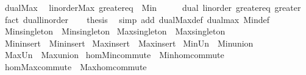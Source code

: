 \begin{isabellebody}
\isamarkupfalse%
%
\endisatagproof
{\isafoldproof}%
%
\isadelimproof
\isanewline
%
\endisadelimproof
\isanewline
{}\isamarkupfalse%
\ dual{\isacharunderscore}{\kern0pt}Max{\isacharcolon}{\kern0pt}\isanewline
\ \ {\isachardoublequoteopen}linorder{\isachardot}{\kern0pt}Max\ greater{\isacharunderscore}{\kern0pt}eq\ {\isacharequal}{\kern0pt}\ Min{\isachardoublequoteclose}\isanewline
%
\isadelimproof
%
\endisadelimproof
%
\isatagproof
{}\isamarkupfalse%
\ {\isacharminus}{\kern0pt}\isanewline
\ \ \isamarkupfalse%
\ dual{\isacharcolon}{\kern0pt}\ linorder\ greater{\isacharunderscore}{\kern0pt}eq\ greater\ \isamarkupfalse%
\ {\isacharparenleft}{\kern0pt}fact\ dual{\isacharunderscore}{\kern0pt}linorder{\isacharparenright}{\kern0pt}\isanewline
\ \ \isamarkupfalse%
\ {\isacharquery}{\kern0pt}thesis\ \isamarkupfalse%
\ {\isacharparenleft}{\kern0pt}simp\ add{\isacharcolon}{\kern0pt}\ dual{\isachardot}{\kern0pt}Max{\isacharunderscore}{\kern0pt}def\ dual{\isacharunderscore}{\kern0pt}max\ Min{\isacharunderscore}{\kern0pt}def{\isacharparenright}{\kern0pt}\isanewline
{}\isamarkupfalse%
%
\endisatagproof
{\isafoldproof}%
%
\isadelimproof
\isanewline
%
\endisadelimproof
\isanewline
{}\isamarkupfalse%
\ Min{\isacharunderscore}{\kern0pt}singleton\ {\isacharequal}{\kern0pt}\ Min{\isachardot}{\kern0pt}singleton\isanewline
{}\isamarkupfalse%
\ Max{\isacharunderscore}{\kern0pt}singleton\ {\isacharequal}{\kern0pt}\ Max{\isachardot}{\kern0pt}singleton\isanewline
{}\isamarkupfalse%
\ Min{\isacharunderscore}{\kern0pt}insert\ {\isacharequal}{\kern0pt}\ Min{\isachardot}{\kern0pt}insert\isanewline
{}\isamarkupfalse%
\ Max{\isacharunderscore}{\kern0pt}insert\ {\isacharequal}{\kern0pt}\ Max{\isachardot}{\kern0pt}insert\isanewline
{}\isamarkupfalse%
\ Min{\isacharunderscore}{\kern0pt}Un\ {\isacharequal}{\kern0pt}\ Min{\isachardot}{\kern0pt}union\isanewline
{}\isamarkupfalse%
\ Max{\isacharunderscore}{\kern0pt}Un\ {\isacharequal}{\kern0pt}\ Max{\isachardot}{\kern0pt}union\isanewline
{}\isamarkupfalse%
\ hom{\isacharunderscore}{\kern0pt}Min{\isacharunderscore}{\kern0pt}commute\ {\isacharequal}{\kern0pt}\ Min{\isachardot}{\kern0pt}hom{\isacharunderscore}{\kern0pt}commute\isanewline
{}\isamarkupfalse%
\ hom{\isacharunderscore}{\kern0pt}Max{\isacharunderscore}{\kern0pt}commute\ {\isacharequal}{\kern0pt}\ Max{\isachardot}{\kern0pt}hom{\isacharunderscore}{\kern0pt}commute\isanewline

\end{isabellebody}
